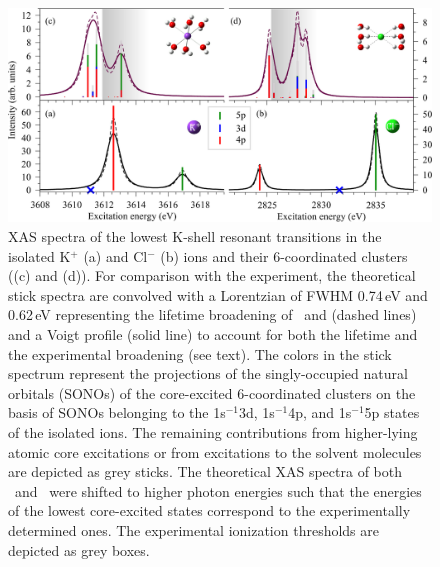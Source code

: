 \begin{figure}[h!]
\centering
\includegraphics[scale=0.55]{figures/xas_spectra.eps}
\caption{XAS spectra of the lowest K-shell resonant transitions in the isolated K$^{+}$ (a) and Cl$^{-}$ (b) ions and their 6-coordinated clusters ((c) and (d)). For comparison with the experiment, the theoretical stick spectra are convolved with a Lorentzian of FWHM 0.74\,eV and 0.62\,eV representing the lifetime broadening of \ki~and \cli \citep{Krause79:329} (dashed lines) and a Voigt profile (solid line) to account for both the lifetime and the experimental broadening (see text). The colors in the stick spectrum represent the projections of the singly-occupied natural orbitals (SONOs) of the core-excited 6-coordinated clusters on the basis of SONOs belonging to the 1s$^{-1}$3d, 1s$^{-1}$4p, and 1s$^{-1}$5p states of the isolated ions. The remaining contributions from higher-lying atomic core excitations or from excitations to the solvent molecules are depicted as grey sticks. The theoretical XAS spectra of both \ki~and \cli~were shifted to higher photon energies such that the energies of the lowest core-excited states correspond to the experimentally determined ones. The experimental ionization thresholds are depicted as grey boxes.}
\label{fg:xas_kcl}
\end{figure}


